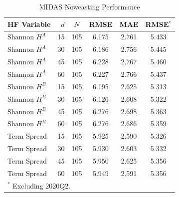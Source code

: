 \begin{table}[htbp]
\centering
\caption{MIDAS Nowcasting Performance}
\label{tab:midas}
\footnotesize
\begin{tabular}{lrcccc}
\toprule
HF Variable & $d$ & $N$ & RMSE & MAE & RMSE$^*$ \\
\midrule
  Shannon $H^A$ & 15 & 105 & 6.175 & 2.761 & 5.433 \\
  Shannon $H^A$ & 30 & 105 & 6.186 & 2.756 & 5.445 \\
  Shannon $H^A$ & 45 & 105 & 6.228 & 2.767 & 5.460 \\
  Shannon $H^A$ & 60 & 105 & 6.227 & 2.766 & 5.437 \\
  Shannon $H^B$ & 15 & 105 & 6.195 & 2.625 & 5.313 \\
  Shannon $H^B$ & 30 & 105 & 6.126 & 2.608 & 5.322 \\
  Shannon $H^B$ & 45 & 105 & 6.276 & 2.698 & 5.363 \\
  Shannon $H^B$ & 60 & 105 & 6.276 & 2.686 & 5.359 \\
  Term Spread & 15 & 105 & 5.925 & 2.590 & 5.326 \\
  Term Spread & 30 & 105 & 5.930 & 2.603 & 5.332 \\
  Term Spread & 45 & 105 & 5.950 & 2.625 & 5.356 \\
  Term Spread & 60 & 105 & 5.949 & 2.591 & 5.356 \\
\bottomrule
\multicolumn{6}{l}{\footnotesize $^*$ Excluding 2020Q2.} \\
\end{tabular}
\end{table}